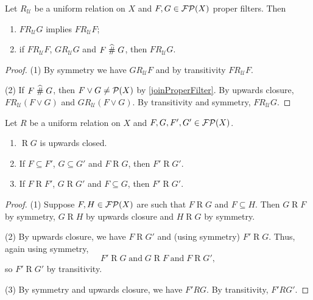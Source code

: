 \begin{lemma} \label{uniformRelationRelatedElementLemma}
Let $R_\mathcal{U}$ be a uniform relation on $X$ and $F,G\in\operatorname{\mathcal{FP}}(X)$ proper filters. Then
\begin{enumerate}
\item $F\mathrel{R_\mathcal{U}} G$ implies $F\mathrel{R_\mathcal{U}} F$;
\item if $F\mathrel{R_\mathcal{U}} F$, $G\mathrel{R_\mathcal{U}} G$ and $F\mathrel{\widehat{\#}} G$, then $F\mathrel{R_\mathcal{U}} G$.
\end{enumerate}
\end{lemma}
\begin{proof}
(1) By symmetry we have $G\mathrel{R_\mathcal{U}} F$ and by transitivity $F\mathrel{R_\mathcal{U}} F$.

(2) If $F\mathrel{\widehat{\#}} G$, then $F\vee G \neq \operatorname{\mathcal{P}}(X)$ by \ref{joinProperFilter}. By upwards closure, $F\mathrel{R_\mathcal{U}} (F\vee G)$ and $G\mathrel{R_\mathcal{U}} (F\vee G)$. By transitivity and symmetry, $F\mathrel{R_\mathcal{U}} G$.
\end{proof}

\begin{lemma} \label{uniformRelationUpwardsClosure}
Let $R$ be a uniform relation on $X$ and $F,G, F', G'\in\operatorname{\mathcal{FP}}(X)$.
\begin{enumerate}
\item $\mathrel{R}G$ is upwards closed.
\item If $F \subseteq F'$, $G\subseteq G'$ and $F\mathrel{R} G$, then $F'\mathrel{R} G'$.
\item If $F \mathrel{R} F'$, $G\mathrel{R} G'$ and $F\subseteq G$, then $F'\mathrel{R} G'$.
\end{enumerate}
\end{lemma}
\begin{proof}
(1) Suppose $F,H\in \operatorname{\mathcal{FP}}(X)$ are such that $F\mathrel{R}G$ and $F\subseteq H$. Then $G\mathrel{R}F$ by symmetry, $G\mathrel{R}H$ by upwards closure and $H\mathrel{R}G$ by symmetry.

(2) By upwards closure, we have $F\mathrel{R} G'$ and  (using symmetry) $F'\mathrel{R} G$. Thus, again using symmetry,
\[ F'\mathrel{R} G \;\text{and}\; G \mathrel{R} F \;\text{and}\; F \mathrel{R} G', \]
so $F'\mathrel{R} G'$ by transitivity.

(3) By symmetry and upwards closure, we have $F'RG$. By transitivity, $F'RG'$.
\end{proof}

